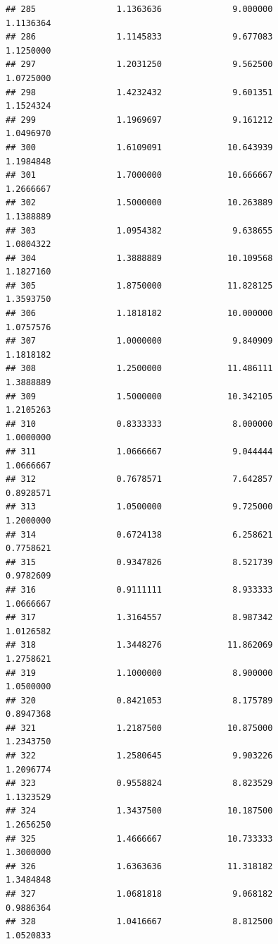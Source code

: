 \documentclass[]{article}
\begin{document}
\begin{verbatim}
## 285                1.1363636              9.000000               1.1136364
## 286                1.1145833              9.677083               1.1250000
## 297                1.2031250              9.562500               1.0725000
## 298                1.4232432              9.601351               1.1524324
## 299                1.1969697              9.161212               1.0496970
## 300                1.6109091             10.643939               1.1984848
## 301                1.7000000             10.666667               1.2666667
## 302                1.5000000             10.263889               1.1388889
## 303                1.0954382              9.638655               1.0804322
## 304                1.3888889             10.109568               1.1827160
## 305                1.8750000             11.828125               1.3593750
## 306                1.1818182             10.000000               1.0757576
## 307                1.0000000              9.840909               1.1818182
## 308                1.2500000             11.486111               1.3888889
## 309                1.5000000             10.342105               1.2105263
## 310                0.8333333              8.000000               1.0000000
## 311                1.0666667              9.044444               1.0666667
## 312                0.7678571              7.642857               0.8928571
## 313                1.0500000              9.725000               1.2000000
## 314                0.6724138              6.258621               0.7758621
## 315                0.9347826              8.521739               0.9782609
## 316                0.9111111              8.933333               1.0666667
## 317                1.3164557              8.987342               1.0126582
## 318                1.3448276             11.862069               1.2758621
## 319                1.1000000              8.900000               1.0500000
## 320                0.8421053              8.175789               0.8947368
## 321                1.2187500             10.875000               1.2343750
## 322                1.2580645              9.903226               1.2096774
## 323                0.9558824              8.823529               1.1323529
## 324                1.3437500             10.187500               1.2656250
## 325                1.4666667             10.733333               1.3000000
## 326                1.6363636             11.318182               1.3484848
## 327                1.0681818              9.068182               0.9886364
## 328                1.0416667              8.812500               1.0520833

\end{verbatim}
\end{document}
